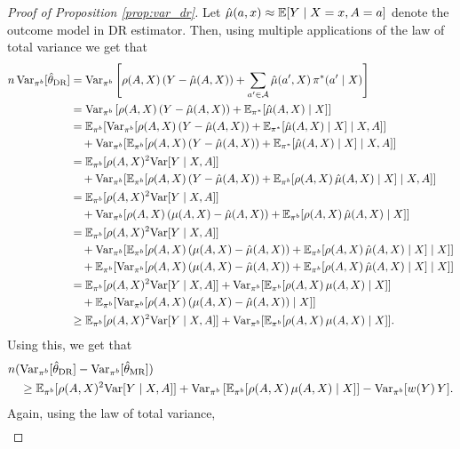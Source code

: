 \begin{proof}[Proof of Proposition \ref{prop:var_dr}]
Let $\hat{\mu}(a, x) \approx \mathbb{E}[Y\mid X=x, A=a]$ denote the outcome model in DR estimator. Then, using multiple applications of the law of total variance we get that
\begin{align*}
    n\, \textup{Var}_{\pi^b}[\hat{\theta}_{\textup{DR}}] &= \textup{Var}_{\pi^b}\left[\rho(A, X)\,(Y - \hat{\mu}(A, X)) + \sum_{a'\in \mathcal{A}} \hat{\mu}(a', X)\,\pi^*(a'\mid X)\right]\\
    &= \textup{Var}_{\pi^b}\left[\rho(A, X)\,(Y - \hat{\mu}(A, X)) + \mathbb{E}_{\pi^*}[\hat{\mu}(A, X)\mid X]\right]\\
    &= \mathbb{E}_{\pi^b}[\textup{Var}_{\pi^b}[\rho(A, X)\,(Y - \hat{\mu}(A, X)) + \mathbb{E}_{\pi^*}[\hat{\mu}(A, X)\mid X]\mid X, A]]\\
    &\quad+ \textup{Var}_{\pi^b}[\mathbb{E}_{\pi^b}[\rho(A, X)\,(Y - \hat{\mu}(A, X)) + \mathbb{E}_{\pi^*}[\hat{\mu}(A, X)\mid X]\mid X, A]]\\
    &= \mathbb{E}_{\pi^b}[\rho(A, X)^2 \textup{Var}[Y\mid X, A]] \\
    &\quad+ \textup{Var}_{\pi^b}[\mathbb{E}_{\pi^b}[\rho(A, X)\,(Y - \hat{\mu}(A, X)) + \mathbb{E}_{\pi^b}[\rho(A, X)\,\hat{\mu}(A, X)\mid X]\mid X, A]]\\
    &= \mathbb{E}_{\pi^b}[\rho(A, X)^2 \textup{Var}[Y\mid X, A]] \\
    &\quad+ \textup{Var}_{\pi^b}[\rho(A, X)\,(\mu(A, X) - \hat{\mu}(A, X)) + \mathbb{E}_{\pi^b}[\rho(A, X)\,\hat{\mu}(A, X)\mid X]]\\
    &= \mathbb{E}_{\pi^b}[\rho(A, X)^2 \textup{Var}[Y\mid X, A]] \\
    &\quad+ \textup{Var}_{\pi^b}[\mathbb{E}_{\pi^b}[\rho(A, X)\,(\mu(A, X) - \hat{\mu}(A, X)) + \mathbb{E}_{\pi^b}[\rho(A, X)\,\hat{\mu}(A, X)\mid X]\mid X]] \\
    &\quad+ \mathbb{E}_{\pi^b}[\textup{Var}_{\pi^b}[\rho(A, X)\,(\mu(A, X) - \hat{\mu}(A, X)) + \mathbb{E}_{\pi^b}[\rho(A, X)\,\hat{\mu}(A, X)\mid X]\mid X]]\\
    &= \mathbb{E}_{\pi^b}[\rho(A, X)^2 \textup{Var}[Y\mid X, A]]+ \textup{Var}_{\pi^b}[\mathbb{E}_{\pi^b}[\rho(A, X)\,\mu(A, X)\mid X]] \\
    &\quad+ \mathbb{E}_{\pi^b}[\textup{Var}_{\pi^b}[\rho(A, X)\,(\mu(A, X) - \hat{\mu}(A, X))\mid X]]\\
    &\geq \mathbb{E}_{\pi^b}[\rho(A, X)^2 \textup{Var}[Y\mid X, A]] + \textup{Var}_{\pi^b}[\mathbb{E}_{\pi^b}[\rho(A, X)\,\mu(A, X)\mid X]].
\end{align*}
Using this, we get that
\begin{align*}
    &n (\textup{Var}_{\pi^b}[\hat{\theta}_{\textup{DR}}] - \textup{Var}_{\pi^b}[\hat{\theta}_{\textup{MR}}]) \\
    &\quad\geq \mathbb{E}_{\pi^b}[\rho(A, X)^2 \textup{Var}[Y\mid X, A]] +  \textup{Var}_{\pi^b} \left[\mathbb{E}_{\pi^b}[\rho(A, X) \,\mu(A, X)\mid X]\right] - \textup{Var}_{\pi^b}[w(Y)\,Y].
\end{align*}
Again, using the law of total variance,
\begin{align*}

\end{align*}
\end{proof}
